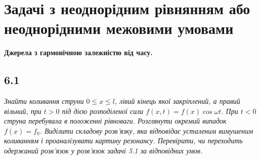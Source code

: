 \documentclass[a4paper, 14pt]{extreport}
\begin{document}
\chapter{Задачі з неоднорідним рівнянням або неоднорідними межовими умовами}

\textbf{\large Джерела з гармонічною залежністю від часу.}

\section[Задача №6.1]{6.1}

\textit{Знайти коливання струни $0 \leq x \leq l$, лівий кінець якої закріплений, а правий вільний, при $t > 0$ під дією розподіленої сили $f(x,t) = f(x)\cos\omega t$. При $t < 0$ струна перебувала в положенні рівноваги. Розглянути окремий випадок $f(x) = f_0$. Виділити складову розв’язку, яка відповідає усталеним вимушеним коливанням і проаналізувати картину резонансу. Перевірити, чи переходить одержаний розв’язок у розв’язок задачі 5.1 за відповідних умов.}
\end{document}
